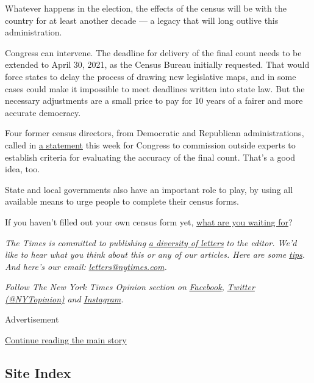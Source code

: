 Whatever happens in the election, the effects of the census will be with
the country for at least another decade --- a legacy that will long
outlive this administration.

Congress can intervene. The deadline for delivery of the final count
needs to be extended to April 30, 2021, as the Census Bureau initially
requested. That would force states to delay the process of drawing new
legislative maps, and in some cases could make it impossible to meet
deadlines written into state law. But the necessary adjustments are a
small price to pay for 10 years of a fairer and more accurate democracy.

Four former census directors, from Democratic and Republican
administrations, called in
\href{https://www.documentcloud.org/documents/7013550-Aug-4-2020-Statement-By-Former-U-S-Census-Bureau.html}{a
statement} this week for Congress to commission outside experts to
establish criteria for evaluating the accuracy of the final count.
That's a good idea, too.

State and local governments also have an important role to play, by
using all available means to urge people to complete their census forms.

If you haven't filled out your own census form yet,
\href{https://2020census.gov/en.html}{what are you waiting for}?

\emph{The Times is committed to publishing}
\href{https://www.nytimes.com/2019/01/31/opinion/letters/letters-to-editor-new-york-times-women.html}{\emph{a
diversity of letters}} \emph{to the editor. We'd like to hear what you
think about this or any of our articles. Here are some}
\href{https://help.nytimes.com/hc/en-us/articles/115014925288-How-to-submit-a-letter-to-the-editor}{\emph{tips}}\emph{.
And here's our email:}
\href{mailto:letters@nytimes.com}{\emph{letters@nytimes.com}}\emph{.}

\emph{Follow The New York Times Opinion section on}
\href{https://www.facebook.com/nytopinion}{\emph{Facebook}}\emph{,}
\href{http://twitter.com/NYTOpinion}{\emph{Twitter (@NYTopinion)}}
\emph{and}
\href{https://www.instagram.com/nytopinion/}{\emph{Instagram}}\emph{.}

Advertisement

\protect\hyperlink{after-bottom}{Continue reading the main story}

\hypertarget{site-index}{%
\subsection{Site Index}\label{site-index}}

